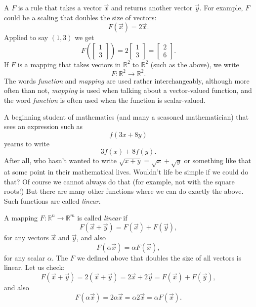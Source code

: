 A \emph{}
$F$ is a rule that takes a vector $\vec{x}$ and returns another vector
$\vec{y}$.  For example, $F$ could be a scaling that doubles the size of
vectors:
\begin{equation*}
F(\vec{x}) = 2 \vec{x} .
\end{equation*}
Applied to say $(1,3)$ we get
\begin{equation*}
F
\left( \begin{bmatrix} 1 \\ 3 \end{bmatrix} \right)
=
2
\begin{bmatrix} 1 \\ 3 \end{bmatrix}
=
\begin{bmatrix} 2 \\ 6 \end{bmatrix} .
\end{equation*}
If $F$ is a mapping that takes vectors in
${\mathbb R}^2$ to 
${\mathbb R}^2$ (such as the above), we write
\begin{equation*}
F \colon {\mathbb R}^2 \to {\mathbb R}^2 .
\end{equation*}
The words \emph{function} and \emph{mapping} are used rather interchangeably,
although more often than not, \emph{mapping} is used when talking about a
vector-valued function, and the word \emph{function} is often used when the
function is scalar-valued.

A beginning student of mathematics (and many a seasoned mathematician)
that
sees an expression such as
\begin{equation*}
f(3x+8y)
\end{equation*}
yearns to write
\begin{equation*}
3f(x)+8f(y) .
\end{equation*}
After all, who hasn't wanted to write $\sqrt{x+y} = \sqrt{x} + \sqrt{y}$ or
something like that at some point in their mathematical lives.
Wouldn't life be simple if we could do that?
Of course we cannot always do that (for example, not with the square roots!)
But there are many other functions where
we can do exactly the above.  Such functions are called \emph{linear}.

A mapping $F \colon {\mathbb R}^n \to {\mathbb R}^m$
is called \emph{linear} if
\begin{equation*}
F(\vec{x}+\vec{y}) = F(\vec{x})+F(\vec{y}),
\end{equation*}
for any vectors $\vec{x}$ and $\vec{y}$,
and also
\begin{equation*}
F(\alpha \vec{x}) = \alpha F(\vec{x}) ,
\end{equation*}
for any scalar $\alpha$.
The $F$ we defined above that doubles the size of all vectors is linear.  Let
us check:
\begin{equation*}
F(\vec{x}+\vec{y})
=
2(\vec{x}+\vec{y})
=
2\vec{x}+2\vec{y}
=
F(\vec{x})+F(\vec{y}) ,
\end{equation*}
and also
\begin{equation*}
F(\alpha \vec{x}) = 2 \alpha \vec{x} = \alpha 2 \vec{x} = \alpha F(\vec{x}) .
\end{equation*}

